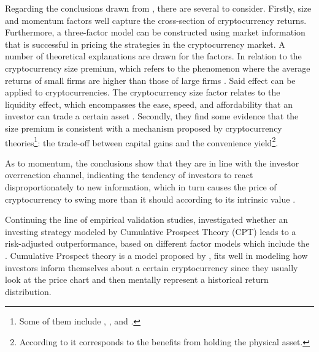 Regarding the conclusions drawn from \parencite{liu2022common}, there are several to consider. Firstly, size and momentum factors well capture the cross-section of cryptocurrency returns. Furthermore, a three-factor model can be constructed using market information that is successful in pricing the strategies in the cryptocurrency market. A number of theoretical explanations are drawn for the factors. In relation to the cryptocurrency size premium, which refers to the phenomenon where the average returns of small firms are higher than those of large firms \parencite{song2023size}. Said effect can be applied to cryptocurrencies. The cryptocurrency size factor relates to the liquidity effect, which encompasses the ease, speed, and affordability that an investor can trade a certain asset \parencite{hasan2022liquidity}. Secondly, they find some evidence that the size premium is consistent with a mechanism proposed by cryptocurrency theories\footnote{Some of them include \parencite{NBERw26816}, \parencite{Prat2019FundamentalPO}, and \parencite{hhaa089}.}: the trade-off between capital gains and the convenience yield\footnote{According to \parencite{Hull_deriv} it corresponds to the benefits from holding the physical asset.}.

As to momentum, the conclusions show that they are in line with the investor overreaction channel, indicating the tendency of investors to react disproportionately to new information, which in turn causes the price of cryptocurrency to swing more than it should according to its intrinsic value \parencite{10.1371/journal.pone.0264522}.

Continuing the line of empirical validation studies, \parencite{thoma2020prospect} investigated whether an investing strategy modeled by Cumulative Prospect Theory (CPT) leads to a risk-adjusted outperformance, based on different factor models which include the \parencite{fama1993}. Cumulative Prospect theory is a model proposed by \parencite{kahneman1979prospect}, fits well in modeling how investors inform themselves about a certain cryptocurrency since they usually look at the price chart and then mentally represent a historical return distribution. 

